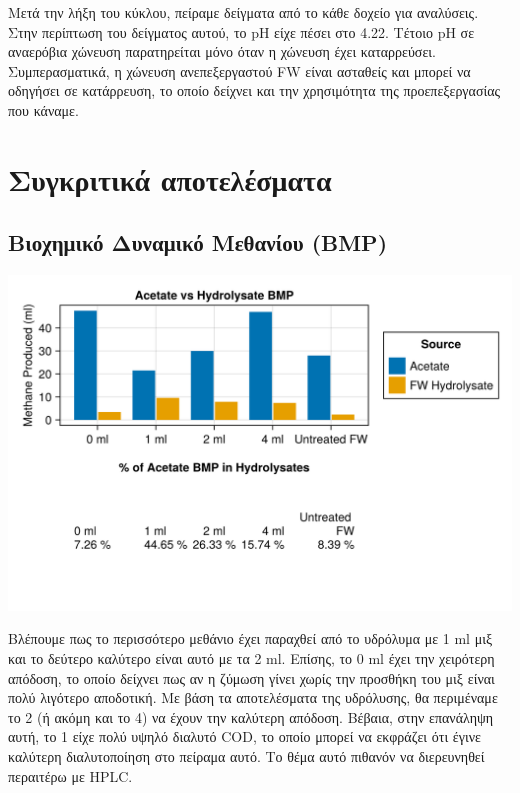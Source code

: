 \documentclass[11pt]{article}
\begin{document}
Μετά την λήξη του κύκλου, πείραμε δείγματα από το κάθε δοχείο για αναλύσεις. Στην περίπτωση του δείγματος αυτού, το pH είχε πέσει στο 4.22. Τέτοιο pH σε αναερόβια χώνευση παρατηρείται μόνο όταν η χώνευση έχει καταρρεύσει. Συμπερασματικά, η χώνευση ανεπεξεργαστού FW είναι ασταθείς και μπορεί να οδηγήσει σε κατάρρευση, το οποίο δείχνει και την χρησιμότητα της προεπεξεργασίας που κάναμε.

\section{Συγκριτικά αποτελέσματα}
\label{sec:orgfa24585}
\subsection{Βιοχημικό Δυναμικό Μεθανίου (BMP)}
\label{sec:org406edcd}
\begin{center}
\includegraphics[width=.9\linewidth]{../plots/BMPs/Hydrolyzed FW/acet_vs_hydro_bmp_s1_r2.png}
\end{center}

Βλέπουμε πως το περισσότερο μεθάνιο έχει παραχθεί από το υδρόλυμα με 1 ml μιξ και το δεύτερο καλύτερο είναι αυτό με τα 2 ml. Επίσης, το 0 ml έχει την χειρότερη απόδοση, το οποίο δείχνει πως αν η ζύμωση γίνει χωρίς την προσθήκη του μιξ είναι πολύ λιγότερο αποδοτική. Με βάση τα αποτελέσματα της υδρόλυσης, θα περιμέναμε το 2 (ή ακόμη και το 4) να έχουν την καλύτερη απόδοση. Βέβαια, στην επανάληψη αυτή, το 1 είχε πολύ υψηλό διαλυτό COD, το οποίο μπορεί να εκφράζει ότι έγινε καλύτερη διαλυτοποίηση στο πείραμα αυτό. Το θέμα αυτό πιθανόν να διερευνηθεί περαιτέρω με HPLC.
\end{document}
